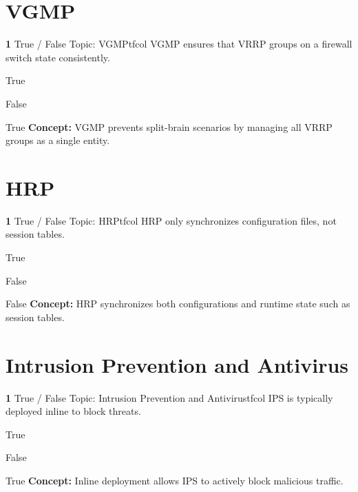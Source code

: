 \documentclass[10pt,a4paper]{article}
\begin{document}
\section{VGMP}
\begin{qcard}{\color{white}\textbf{1} \hfill \small True / False \textbar{} Topic: VGMP}{tfcol}
VGMP ensures that VRRP groups on a firewall switch state consistently.

\begin{qoptions}
\item True
\item False
\end{qoptions}
\begin{explainbox}{True}
\textbf{Concept:} VGMP prevents split-brain scenarios by managing all VRRP groups as a single entity.
\end{explainbox}
\end{qcard}

\section{HRP}
\begin{qcard}{\color{white}\textbf{1} \hfill \small True / False \textbar{} Topic: HRP}{tfcol}
HRP only synchronizes configuration files, not session tables.

\begin{qoptions}
\item True
\item False
\end{qoptions}
\begin{explainbox}{False}
\textbf{Concept:} HRP synchronizes both configurations and runtime state such as session tables.
\end{explainbox}
\end{qcard}

\section{Intrusion Prevention and Antivirus}
\begin{qcard}{\color{white}\textbf{1} \hfill \small True / False \textbar{} Topic: Intrusion Prevention and Antivirus}{tfcol}
IPS is typically deployed inline to block threats.

\begin{qoptions}
\item True
\item False
\end{qoptions}
\begin{explainbox}{True}
\textbf{Concept:} Inline deployment allows IPS to actively block malicious traffic.
\end{explainbox}
\end{qcard}
\end{document}

